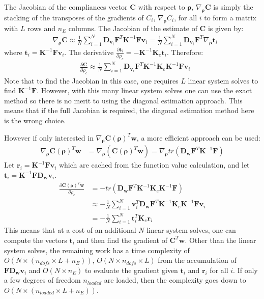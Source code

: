     The Jacobian of the compliances vector $\bm{C}$ with respect to $\bm{\rho}$, $\nabla_{\bm{\rho}} \bm{C}$ is simply the stacking of the transposes of the gradients of $C_i$, $\nabla_{\bm{\rho}} C_i$, for all $i$ to form a matrix with $L$ rows and $n_E$ columns. The Jacobian of the estimate of $\bm{C}$ is given by:
      \begin{align}
       & \nabla_{\bm{\rho}} \bm{C} \approx \frac{1}{N} \sum_{i=1}^N \bm{D}_{\bm{v}_i} \bm{\bm{F}}^T \bm{K}^{-1} \bm{F} \bm{v}_i = \frac{1}{N} \sum_{i=1}^N \bm{D}_{\bm{v}_i} \bm{F}^T \nabla_{\bm{\rho}} \bm{t}_i
      \end{align}
    where $\bm{t}_i = \bm{K}^{-1} \bm{F} \bm{v}_i$. The derivative $\frac{\partial \bm{t}_i}{\partial \rho_e} = -\bm{K}^{-1} \bm{K}_e \bm{t}_i$. Therefore:
      \begin{align}
       & \frac{\partial \bm{C}}{\partial \rho_e} \approx \frac{1}{N} \sum_{i=1}^N \bm{D}_{\bm{v}_i} \bm{\bm{F}}^T \bm{K}^{-1} \bm{K}_e \bm{K}^{-1} \bm{\bm{F}} \bm{v}_i
      \end{align}
    Note that to find the Jacobian in this case, one requires $L$ linear system solves to find $\bm{K}^{-1} \bm{F}$. However, with this many linear system solves one can use the exact method so there is no merit to using the diagonal estimation approach. This means that if the full Jacobian is required, the diagonal estimation method here is the wrong choice.

    However if only interested in $\nabla_{\bm{\rho}} \bm{C}(\bm{\rho})^T \bm{w}$, a more efficient approach can be used:
      \begin{align}
       \nabla_{\bm{\rho}} \bm{C}(\bm{\rho})^T \bm{w} & = \nabla_{\bm{\rho}} (\bm{C}(\bm{\rho})^T \bm{w}) = \nabla_{\bm{\rho}} tr(\bm{D}_{\bm{w}} \bm{F}^T \bm{K}^{-1} \bm{F})
      \end{align}
    Let $\bm{r}_i = \bm{K}^{-1} \bm{F} \bm{v}_i$ which are cached from the function value calculation, and let $\bm{t}_i = \bm{K}^{-1} \bm{F} \bm{D}_{\bm{w}} \bm{v}_i$.
      \begin{align}
       \frac{\partial \bm{C}(\bm{\rho})^T \bm{w}}{\partial \rho_e} & = -tr(\bm{D}_{\bm{w}} \bm{F}^T \bm{K}^{-1} \bm{K}_e \bm{K}^{-1} \bm{F}) \\
       & \approx -\frac{1}{N} \sum_{i=1}^N \bm{v}_i^T \bm{D}_{\bm{w}} \bm{F}^T \bm{K}^{-1} \bm{K}_e \bm{K}^{-1} \bm{F} \bm{v}_i \\
       & = -\frac{1}{N} \sum_{i=1}^N \bm{t}_i^T \bm{K}_e \bm{r}_i 
      \end{align}
    This means that at a cost of an additional $N$ linear system solves, one can compute the vectors $\bm{t}_i$ and then find the gradient of $\bm{C}^T \bm{w}$. Other than the linear system solves, the remaining work has a time complexity of $O(N \times (n_{dofs} \times L + n_E))$, $O(N \times n_{dofs} \times L)$ from the accumulation of $\bm{F} \bm{D}_{\bm{w}} \bm{v}_i$ and $O(N \times n_E)$ to evaluate the gradient given $\bm{t}_i$ and $\bm{r}_i$ for all $i$. If only a few degrees of freedom $n_{loaded}$ are loaded, then the complexity goes down to $O(N \times (n_{loaded} \times L + n_E))$.

